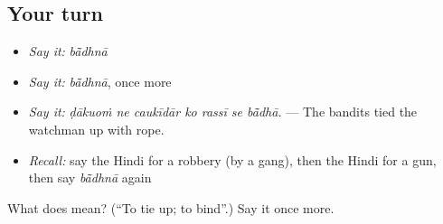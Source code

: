 \subsection*{Your turn}
\begin{itemize}
\raggedright
  \item \emph{Say it:} \emph{bā̃dhnā}
  \item \emph{Say it:} \emph{bā̃dhnā}, once more
  \item \emph{Say it:} \emph{ḍākuoṁ ne caukīdār ko rassī se bā̃dhā.} — The bandits tied the watchman up with rope.
  \item \emph{Recall:} say the Hindi for a robbery (by a gang), then the Hindi for a gun, then say \emph{bā̃dhnā} again
\end{itemize}

\begin{tcolorbox}[breakable,colback=teal!4,colframe=teal!35!black,title={Before you move on}]
What does  mean? (\textquotedblleft{}To tie up; to bind\textquotedblright{}.) Say it once more.
\end{tcolorbox}
